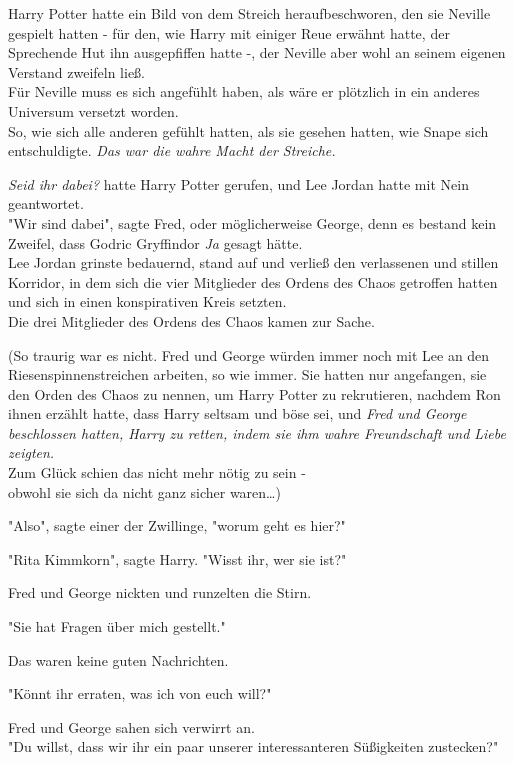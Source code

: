 {Harry Potter hatte ein Bild von dem Streich heraufbeschworen, den sie Neville gespielt hatten - für den, wie Harry mit einiger Reue erwähnt hatte, der Sprechende Hut ihn ausgepfiffen hatte -, der Neville aber wohl an seinem eigenen Verstand zweifeln ließ.\\ Für Neville muss es sich angefühlt haben, als wäre er plötzlich in ein anderes Universum versetzt worden.\\ So, wie sich alle anderen gefühlt hatten, als sie gesehen hatten, wie Snape sich entschuldigte. \emph{Das war die wahre Macht der Streiche.}

\emph{Seid ihr dabei?} hatte Harry Potter gerufen, und Lee Jordan hatte mit Nein geantwortet.\\ "Wir sind dabei", sagte Fred, oder möglicherweise George, denn es bestand kein Zweifel, dass Godric Gryffindor \emph{Ja} gesagt hätte.\\ Lee Jordan grinste bedauernd, stand auf und verließ den verlassenen und stillen Korridor, in dem sich die vier Mitglieder des Ordens des Chaos getroffen hatten und sich in einen konspirativen Kreis setzten.\\ Die drei Mitglieder des Ordens des Chaos kamen zur Sache.

(So traurig war es nicht. Fred und George würden immer noch mit Lee an den Riesenspinnenstreichen arbeiten, so wie immer. Sie hatten nur angefangen, sie den Orden des Chaos zu nennen, um Harry Potter zu rekrutieren, nachdem Ron ihnen erzählt hatte, dass Harry seltsam und böse sei, und \emph{Fred und George beschlossen hatten, Harry zu retten, indem sie ihm wahre Freundschaft und Liebe zeigten.}\\ Zum Glück schien das nicht mehr nötig zu sein -\\ obwohl sie sich da nicht ganz sicher waren…)

"Also", sagte einer der Zwillinge, "worum geht es hier?"

"Rita Kimmkorn", sagte Harry. "Wisst ihr, wer sie ist?"

Fred und George nickten und runzelten die Stirn.

"Sie hat Fragen über mich gestellt."

Das waren keine guten Nachrichten.

"Könnt ihr erraten, was ich von euch will?"

Fred und George sahen sich verwirrt an.\\ "Du willst, dass wir ihr ein paar unserer interessanteren Süßigkeiten zustecken?"

}
